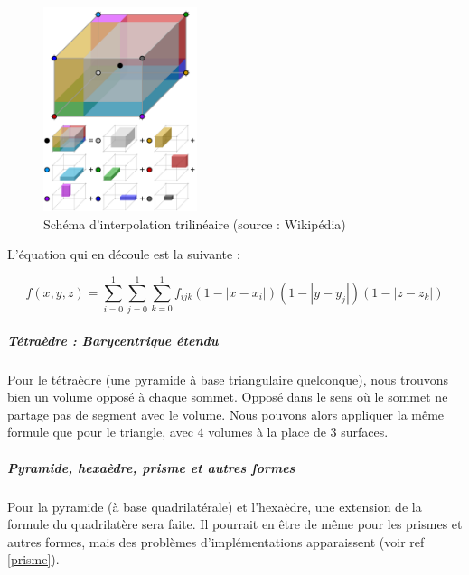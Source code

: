 \begin{figure}[H]
    \centering
    \includegraphics[width=0.4\textwidth]{images/Trilinear_interpolation_visualisation.svg.png}
    \caption{Schéma d'interpolation trilinéaire (source : Wikipédia)} %
\end{figure}

L'équation qui en découle est la suivante :

\begin{equation}
    f(x, y, z) = \sum_{i=0}^{1} \sum_{j=0}^{1} \sum_{k=0}^{1} f_{ijk} (1 - |x - x_i|)(1 - |y - y_j|)(1 - |z - z_k|)
\end{equation}



\subparagraph{Tétraèdre : Barycentrique étendu}

Pour le tétraèdre (une pyramide à base triangulaire quelconque), nous trouvons bien un volume opposé à chaque sommet. Opposé dans le sens où le sommet ne partage pas de segment avec le volume. Nous pouvons alors appliquer la même formule que pour le triangle, avec 4 volumes à la place de 3 surfaces.

\subparagraph{Pyramide, hexaèdre, prisme et autres formes}

Pour la pyramide (à base quadrilatérale) et l’hexaèdre, une extension de la formule du quadrilatère sera faite.
Il pourrait en être de même pour les prismes et autres formes, mais des problèmes d'implémentations apparaissent (voir ref \ref{prisme}).


